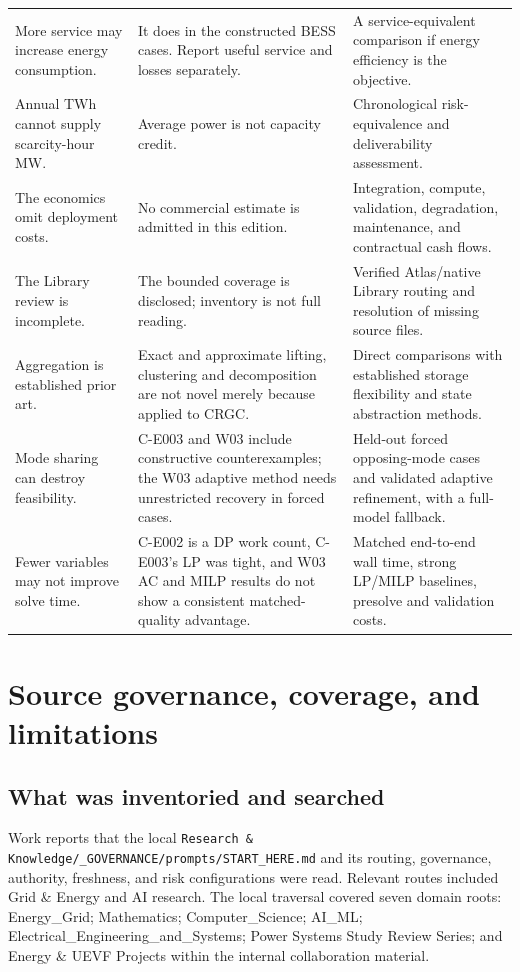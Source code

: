 \documentclass[11pt,letterpaper]{article}
\begin{document}
\begin{longtable}{P{.27\linewidth}P{.38\linewidth}P{.26\linewidth}}
More service may increase energy consumption. & It does in the constructed BESS cases. Report useful service and losses separately. & A service-equivalent comparison if energy efficiency is the objective.\\
Annual TWh cannot supply scarcity-hour MW. & Average power is not capacity credit. & Chronological risk-equivalence and deliverability assessment.\\
The economics omit deployment costs. & No commercial estimate is admitted in this edition. & Integration, compute, validation, degradation, maintenance, and contractual cash flows.\\
The Library review is incomplete. & The bounded coverage is disclosed; inventory is not full reading. & Verified Atlas/native Library routing and resolution of missing source files.\\
Aggregation is established prior art. & Exact and approximate lifting, clustering and decomposition are not novel merely because applied to CRGC. & Direct comparisons with established storage flexibility and state abstraction methods.\\
Mode sharing can destroy feasibility. & C-E003 and W03 include constructive counterexamples; the W03 adaptive method needs unrestricted recovery in forced cases. & Held-out forced opposing-mode cases and validated adaptive refinement, with a full-model fallback.\\
Fewer variables may not improve solve time. & C-E002 is a DP work count, C-E003's LP was tight, and W03 AC and MILP results do not show a consistent matched-quality advantage. & Matched end-to-end wall time, strong LP/MILP baselines, presolve and validation costs.\\
\bottomrule
\end{longtable}

\section{Source governance, coverage, and limitations}
\label{sec:sources}
\subsection{What was inventoried and searched}
Work reports that the local \texttt{Research \& Knowledge/\_GOVERNANCE/prompts/START\_HERE.md} and its routing, governance, authority, freshness, and risk configurations were read. Relevant routes included Grid \& Energy and AI research. The local traversal covered seven domain roots: Energy\_Grid; Mathematics; Computer\_Science; AI\_ML; Electrical\_Engineering\_and\_Systems; Power Systems Study Review Series; and Energy \& UEVF Projects within the internal collaboration material.
\end{document}
